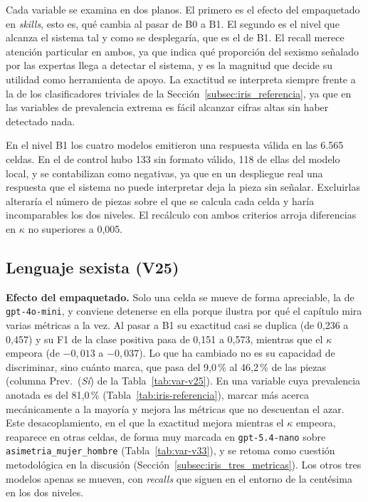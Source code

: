 Cada variable se examina en dos planos. El primero es el efecto del empaquetado en
\textit{skills}, esto es, qué cambia al pasar de B0 a B1. El segundo es el nivel que
alcanza el sistema tal y como se desplegaría, que es el de B1. El recall merece
atención particular en ambos, ya que indica qué proporción del sexismo señalado por
las expertas llega a detectar el sistema, y es la magnitud que decide su utilidad
como herramienta de apoyo. La exactitud se interpreta siempre frente a la de los
clasificadores triviales de la Sección~\ref{subsec:iris_referencia}, ya que en las
variables de prevalencia extrema es fácil alcanzar cifras altas sin haber detectado
nada.

En el nivel B1 los cuatro modelos emitieron una respuesta válida en las
6.565 celdas. En el de control hubo 133 sin formato válido, 118 de ellas del modelo
local, y se contabilizan como negativas, ya que en un despliegue real una respuesta que
el sistema no puede interpretar deja la pieza sin señalar. Excluirlas alteraría el
número de piezas sobre el que se calcula cada celda y haría incomparables los dos
niveles. El recálculo con ambos criterios arroja diferencias en $\kappa$ no superiores
a 0,005.

\subsection{Lenguaje sexista (V25)}



\textbf{Efecto del empaquetado.} Solo una celda se mueve de forma apreciable, la de
\texttt{gpt-4o-mini}, y conviene detenerse en ella porque ilustra por qué el
capítulo mira varias métricas a la vez. Al pasar a B1 su exactitud casi se duplica
(de 0,236 a 0,457) y su F1 de la clase positiva pasa de 0,151 a 0,573, mientras que
el $\kappa$ empeora (de $-0,013$ a $-0,037$). Lo que ha cambiado no es su capacidad
de discriminar, sino cuánto marca, que pasa del 9,0\,\% al 46,2\,\% de las piezas
(columna Prev.~(\textit{Sí}) de la Tabla~\ref{tab:var-v25}).
En una variable cuya prevalencia anotada es del 81,0\,\% (Tabla~\ref{tab:iris-referencia}), marcar más acerca
mecánicamente a la mayoría y mejora las métricas que no descuentan el azar. Este
desacoplamiento, en el que la exactitud mejora mientras el $\kappa$ empeora, reaparece
en otras celdas, de forma muy marcada en \texttt{gpt-5.4-nano} sobre
\texttt{asimetria\_mujer\_hombre} (Tabla~\ref{tab:var-v33}), y se retoma como
cuestión metodológica en la discusión
(Sección~\ref{subsec:iris_tres_metricas}). Los otros tres modelos
apenas se mueven, con \textit{recalls} que siguen en el entorno de la centésima en los dos
niveles.


